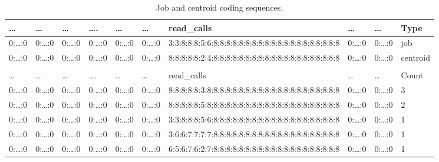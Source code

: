 \documentclass[]{llncs}
\begin{document}
\begin{table}
  \centering
  \begin{tiny}
    \begin{tabular}{@{ }l@{ }@{ }l@{ }@{ }l@{ }@{ }l@{ }@{ }l@{ }@{ }l@{ }@{ }l@{ }@{ }l@{ }@{ }l@{ }@{ }l@{ }}
      \dots     & \dots     & \dots     & \dots.    & …         & \dots     & read\_calls                                           & \dots     & \dots     & Type     \\ 
			\hline
      0:\dots:0 & 0:\dots:0 & 0:\dots:0 & 0:\dots:0 & 0:\dots:0 & 0:\dots:0 & 3:3:8:8:8:5:6:8:8:8:8:8:8:8:8:8:8:8:8:8:8:8:8:8:8:8:8 & 0:\dots:0 & 0:\dots:0 & job      \\ 
      0:\dots:0 & 0:\dots:0 & 0:\dots:0 & 0:\dots:0 & 0:\dots:0 & 0:\dots:0 & 8:8:8:8:8:2:4:8:8:8:8:8:8:8:8:8:8:8:8:8:8:8:8:8:8:8:8 & 0:\dots:0 & 0:\dots:0 & centroid \\ 
      &           &           &           &           &           &                                                       &           &           &          \\ 
      \dots     & \dots     & \dots     & \dots.    & …         & \dots     & read\_calls                                           & \dots     & \dots     & Count    \\ 
			\hline
      0:\dots:0 & 0:\dots:0 & 0:\dots:0 & 0:\dots:0 & 0:\dots:0 & 0:\dots:0 & 8:8:8:8:8:3:8:8:8:8:8:8:8:8:8:8:8:8:8:8:8:8:8:8:8:8:8 & 0:\dots:0 & 0:\dots:0 & 3        \\ 
      0:\dots:0 & 0:\dots:0 & 0:\dots:0 & 0:\dots:0 & 0:\dots:0 & 0:\dots:0 & 8:8:8:8:8:5:8:8:8:8:8:8:8:8:8:8:8:8:8:8:8:8:8:8:8:8:8 & 0:\dots:0 & 0:\dots:0 & 2        \\ 
      0:\dots:0 & 0:\dots:0 & 0:\dots:0 & 0:\dots:0 & 0:\dots:0 & 0:\dots:0 & 3:3:8:8:8:5:6:8:8:8:8:8:8:8:8:8:8:8:8:8:8:8:8:8:8:8:8 & 0:\dots:0 & 0:\dots:0 & 1        \\ 
      0:\dots:0 & 0:\dots:0 & 0:\dots:0 & 0:\dots:0 & 0:\dots:0 & 0:\dots:0 & 3:6:6:7:7:7:7:8:8:8:8:8:8:8:8:8:8:8:8:8:8:8:8:8:8:8:8 & 0:\dots:0 & 0:\dots:0 & 1        \\ 
      0:\dots:0 & 0:\dots:0 & 0:\dots:0 & 0:\dots:0 & 0:\dots:0 & 0:\dots:0 & 6:5:6:7:6:2:7:8:8:8:8:8:8:8:8:8:8:8:8:8:8:8:8:8:8:8:8 & 0:\dots:0 & 0:\dots:0 & 1        \\ 
    \end{tabular}
  \end{tiny}
  \caption{Job and centroid coding sequences.}
  \label{tab:use_case:hex_native:job_centroid}
\end{table}
\end{document}
